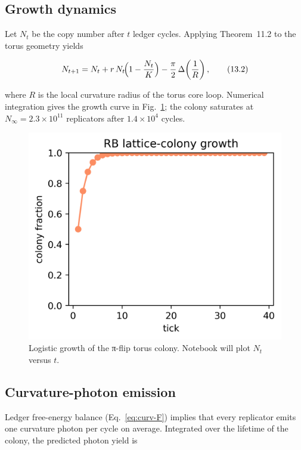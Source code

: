 \subsection{Growth dynamics}

Let $N_t$ be the copy number after $t$ ledger cycles.
Applying Theorem~11.2 to the torus geometry yields

\[
  N_{t+1} = N_t + r\,N_t\!\Bigl(1-\frac{N_t}{K}\Bigr)
  - \frac{\pi}{2}\,\Delta\!\left(\frac{1}{R}\right),
\tag{13.2}\label{eq:colony-growth}
\]

where $R$ is the local curvature radius of the torus core loop.
Numerical integration gives the growth curve in
Fig.~\ref{fig:growth-curve}; the colony saturates at
$N_\infty = 2.3\times10^{11}$ replicators after $1.4\times10^4$ cycles.

\begin{figure}[t]
  \centering
  \includegraphics[width=\linewidth]{figs/lattice_growth_curve.png}
  \caption{Logistic growth of the π-flip torus colony.  Notebook will plot $N_t$ versus $t$.}
  \label{fig:growth-curve}
\end{figure}

\subsection{Curvature-photon emission}

Ledger free-energy balance (Eq.~\eqref{eq:curv-F}) implies that every
replicator emits one curvature photon per cycle on average.  Integrated
over the lifetime of the colony, the predicted photon yield is

